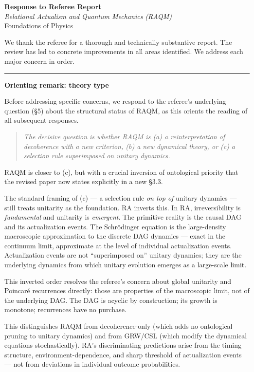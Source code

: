 \documentclass[11pt]{article}
\newcommand{\refereequote}[1]{%
  \begin{quote}\itshape\small #1\end{quote}}
\begin{document}
\noindent
\textbf{Response to Referee Report}\\
\textit{Relational Actualism and Quantum Mechanics (RAQM)}\\
Foundations of Physics

\bigskip\noindent
We thank the referee for a thorough and technically substantive report.
The review has led to concrete improvements in all areas identified.
We address each major concern in order.

\bigskip\hrule\bigskip

\noindent\textbf{Orienting remark: theory type}

Before addressing specific concerns, we respond to the referee's underlying
question (\S5) about the structural status of RAQM, as this orients the
reading of all subsequent responses.

\refereequote{The decisive question is whether RAQM is (a) a reinterpretation
of decoherence with a new criterion, (b) a new dynamical theory, or (c) a
selection rule superimposed on unitary dynamics.}

RAQM is closer to (c), but with a crucial inversion of ontological priority
that the revised paper now states explicitly in a new \S3.3.

The standard framing of (c) --- a selection rule \emph{on top of} unitary
dynamics --- still treats unitarity as the foundation. RA inverts this.
In RA, irreversibility is \emph{fundamental} and unitarity is \emph{emergent}.
The primitive reality is the causal DAG and its actualization events.
The Schr\"{o}dinger equation is the large-density macroscopic approximation
to the discrete DAG dynamics --- exact in the continuum limit, approximate
at the level of individual actualization events. Actualization events are
not ``superimposed on'' unitary dynamics; they are the underlying dynamics
from which unitary evolution emerges as a large-scale limit.

This inverted order resolves the referee's concern about global unitarity
and Poincar\'{e} recurrences directly: those are properties of the
macroscopic limit, not of the underlying DAG. The DAG is acyclic by
construction; its growth is monotone; recurrences have no purchase.

This distinguishes RAQM from decoherence-only (which adds no ontological
pruning to unitary dynamics) and from GRW/CSL (which modify the dynamical
equations stochastically). RA's discriminating predictions arise from the
timing structure, environment-dependence, and sharp threshold of
actualization events --- not from deviations in individual outcome probabilities.
\end{document}
